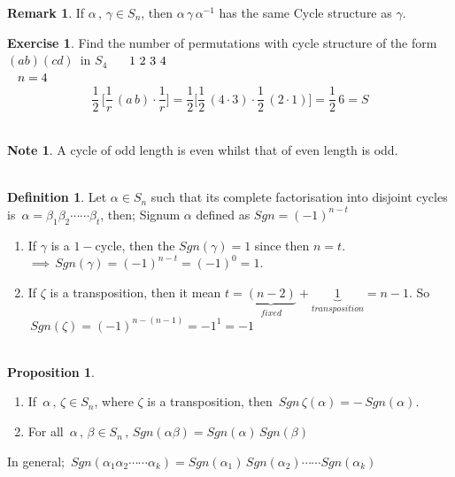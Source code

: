 \documentclass[11pt,a4paper]{article}
\theoremstyle{definition}
\newtheorem{defn}[thm]{Definition}
\newtheorem{prop}[thm]{Proposition}
\newtheorem{exe}[thm]{Exercise}
\newtheorem*{note}{Note}
\newtheorem*{remark}{Remark}
\begin{document}
\begin{remark}
If $\alpha\, ,\, \gamma\in S_n$, then $\alpha\, \gamma\,\alpha^{-1}$ has the same Cycle structure as $\gamma$.\\
\end{remark}


\begin{exe}
Find the number of permutations with cycle structure of the form $(ab)(cd)\,$ in $S_4$ $\hspace{0.5cm} 1\,\, 2\, \, 3\,\, 4$\\ $ \hspace{0.3cm} n = 4$
$$\dfrac{1}{2}\,\Big[\dfrac{1}{r}\, (a\, b) \cdot \dfrac{1}{r}\Big] = \dfrac{1}{2}\Big[\dfrac{1}{2}\,(4\cdot 3)\cdot \dfrac{1}{2}\, (2\cdot 1)\Big] = \dfrac{1}{2}\, 6 = S$$\\
\end{exe}


\begin{note}
A cycle of odd length is even whilst that of even length is odd.\\\\
\end{note}



\begin{defn}
Let $\alpha\in S_n$ such that its complete factorisation into disjoint cycles is $\, \alpha = \beta_1\beta_2\cdots\cdots\beta_t$, then;  Signum $\alpha$ defined as $Sgn = (-1)^{n-t}$
\begin{enumerate}
\item[(a)] If $\gamma$ is a $1-$cycle, then the $Sgn(\gamma)= 1$ since then $n = t$.\\ $\implies \, Sgn(\gamma) = (-1)^{n-t} = (-1)^0 = 1$.
\item[(b)] If $\zeta$ is a transposition, then it mean $t = \underbrace{(n-2)}_{fixed}+ \underbrace{1}_{transposition} = n-1$. So\\ $\, Sgn(\zeta) = (-1)^{n-(n-1)} = -1^1 = -1$\\\\
\end{enumerate}
\end{defn}








\begin{prop}
\begin{enumerate}
\item[(i)] If $\, \alpha\, , \, \zeta\in S_n$, where $\zeta$ is a transposition, then $\,Sgn\, \zeta(\alpha) = -\, Sgn(\alpha)$.
\item[(ii)] For all $\, \alpha\, , \, \beta \in S_n\, , \, Sgn(\alpha\beta) = Sgn(\alpha)\,Sgn(\beta)$\\
\end{enumerate}

In general; $\, Sgn(\alpha_1\alpha_2\cdots\cdots \alpha_k) = Sgn(\alpha_1)\, Sgn(\alpha_2)\cdots\cdots Sgn(\alpha_k)$\\\\
\end{prop}
\end{document}
